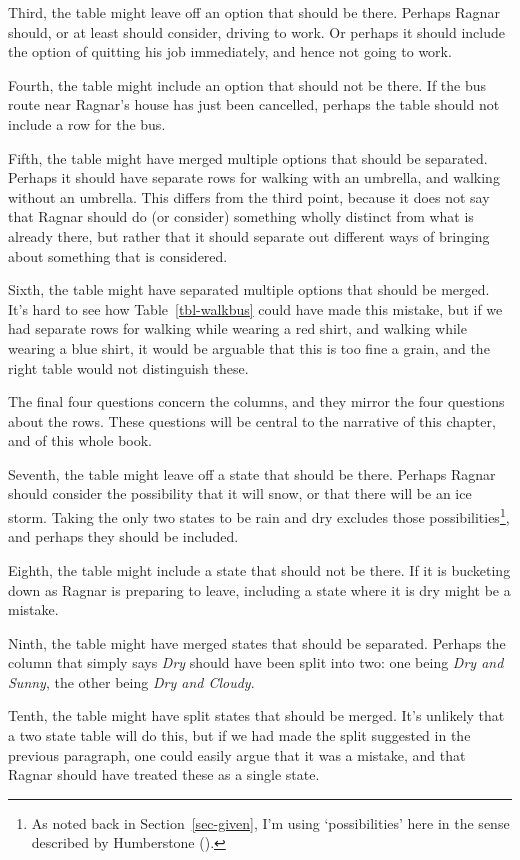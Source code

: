 \documentclass[
  12pt,
  letterpaper,
]{scrbook}
\begin{document}
Third, the table might leave off an option that should be there. Perhaps
Ragnar should, or at least should consider, driving to work. Or perhaps
it should include the option of quitting his job immediately, and hence
not going to work.

Fourth, the table might include an option that should not be there. If
the bus route near Ragnar's house has just been cancelled, perhaps the
table should not include a row for the bus.

Fifth, the table might have merged multiple options that should be
separated. Perhaps it should have separate rows for walking with an
umbrella, and walking without an umbrella. This differs from the third
point, because it does not say that Ragnar should do (or consider)
something wholly distinct from what is already there, but rather that it
should separate out different ways of bringing about something that is
considered.

Sixth, the table might have separated multiple options that should be
merged. It's hard to see how Table~\ref{tbl-walkbus} could have made
this mistake, but if we had separate rows for walking while wearing a
red shirt, and walking while wearing a blue shirt, it would be arguable
that this is too fine a grain, and the right table would not distinguish
these.

The final four questions concern the columns, and they mirror the four
questions about the rows. These questions will be central to the
narrative of this chapter, and of this whole book.

Seventh, the table might leave off a state that should be there. Perhaps
Ragnar should consider the possibility that it will snow, or that there
will be an ice storm. Taking the only two states to be rain and dry
excludes those possibilities\footnote{As noted back in
  Section~\ref{sec-given}, I'm using `possibilities' here in the sense
  described by Humberstone ().}, and
perhaps they should be included.

Eighth, the table might include a state that should not be there. If it
is bucketing down as Ragnar is preparing to leave, including a state
where it is dry might be a mistake.

Ninth, the table might have merged states that should be separated.
Perhaps the column that simply says \emph{Dry} should have been split
into two: one being \emph{Dry and Sunny}, the other being \emph{Dry and
Cloudy}.

Tenth, the table might have split states that should be merged. It's
unlikely that a two state table will do this, but if we had made the
split suggested in the previous paragraph, one could easily argue that
it was a mistake, and that Ragnar should have treated these as a single
state.
\end{document}
